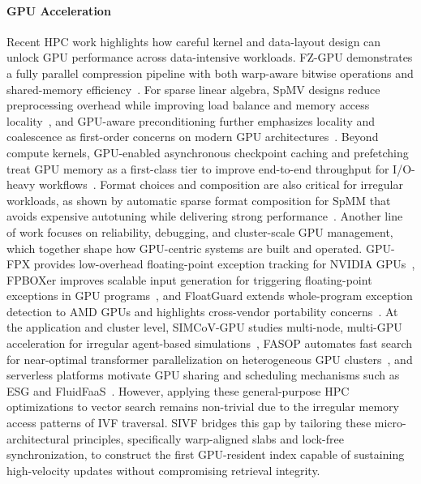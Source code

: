 \documentclass[sigconf,nonacm]{acmart}
\theoremstyle{plain}
\theoremstyle{definition}
\theoremstyle{remark}
\begin{document}
\paragraph{GPU Acceleration}
Recent HPC work highlights how careful kernel and data-layout design can unlock GPU performance across data-intensive workloads. FZ-GPU demonstrates a fully parallel compression pipeline with both warp-aware bitwise operations and shared-memory efficiency~\cite{10.1145/3588195.3592994}. For sparse linear algebra, SpMV designs reduce preprocessing overhead while improving load balance and memory access locality~\cite{10.1145/3588195.3593002}, and GPU-aware preconditioning further emphasizes locality and coalescence as first-order concerns on modern GPU architectures~\cite{10.1145/3625549.3658683}. Beyond compute kernels, GPU-enabled asynchronous checkpoint caching and prefetching treat GPU memory as a first-class tier to improve end-to-end throughput for I/O-heavy workflows~\cite{10.1145/3588195.3592987}. Format choices and composition are also critical for irregular workloads, as shown by automatic sparse format composition for SpMM that avoids expensive autotuning while delivering strong performance~\cite{10.1145/3731545.3731574}.
Another line of work focuses on reliability, debugging, and cluster-scale GPU management, which together shape how GPU-centric systems are built and operated. GPU-FPX provides low-overhead floating-point exception tracking for NVIDIA GPUs~\cite{10.1145/3588195.3592991}, FPBOXer improves scalable input generation for triggering floating-point exceptions in GPU programs~\cite{10.1145/3625549.3658660}, and FloatGuard extends whole-program exception detection to AMD GPUs and highlights cross-vendor portability concerns~\cite{10.1145/3731545.3731586}. At the application and cluster level, SIMCoV-GPU studies multi-node, multi-GPU acceleration for irregular agent-based simulations~\cite{10.1145/3625549.3658692}, FASOP automates fast search for near-optimal transformer parallelization on heterogeneous GPU clusters~\cite{10.1145/3625549.3658687}, and serverless platforms motivate GPU sharing and scheduling mechanisms such as ESG and FluidFaaS~\cite{10.1145/3625549.3658657,10.1145/3731545.3731580}. 
However, applying these general-purpose HPC optimizations to vector search remains non-trivial due to the irregular memory access patterns of IVF traversal. SIVF bridges this gap by tailoring these micro-architectural principles, specifically warp-aligned slabs and lock-free synchronization, to construct the first GPU-resident index capable of sustaining high-velocity updates without compromising retrieval integrity.
\end{document}
